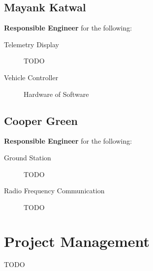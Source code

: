 \documentclass{article}
\begin{document}
\subsection{Mayank Katwal}

\textbf{Responsible Engineer} for the following:

\begin{description}
	\item [Telemetry Display] TODO
	\item [Vehicle Controller] Hardware of Software
\end{description}

\subsection{Cooper Green}

\textbf{Responsible Engineer} for the following:

\begin{description}
	\item [Ground Station] TODO
	\item [Radio Frequency Communication] TODO
\end{description}

\section{Project Management}

TODO
\end{document}
